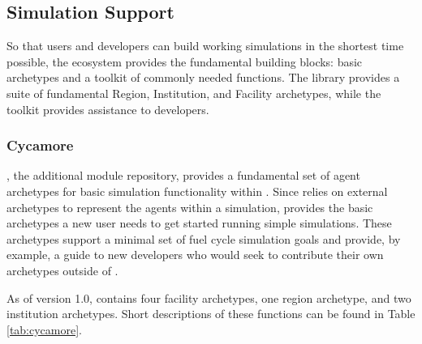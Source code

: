 
\subsection{Simulation Support}
So that users and developers can build working simulations
in the shortest time possible, the \Cyclus ecosystem provides the fundamental 
building blocks: basic archetypes and a toolkit of commonly needed functions.
The \Cycamore library provides a suite of fundamental Region, Institution, and 
Facility archetypes, while the \Cyclus toolkit provides assistance to 
developers.

\subsubsection{Cycamore}

\Cycamore \cite{carlsen_cycamore_2014}, the \Cyclus additional module
repository, provides a fundamental set of agent archetypes for basic simulation 
functionality within \Cyclus.  Since \Cyclus relies on external 
archetypes to represent the agents within a simulation, \Cycamore provides the 
basic archetypes a new user needs to get started running simple simulations.  
These archetypes support a minimal set of fuel cycle simulation goals and 
provide, by example, a guide to new developers who would seek to contribute 
their own archetypes outside of \Cycamore.

As of version 1.0, \Cycamore contains four facility archetypes, one region 
archetype, and two institution archetypes. Short descriptions of these 
functions can be found in Table \ref{tab:cycamore}.


